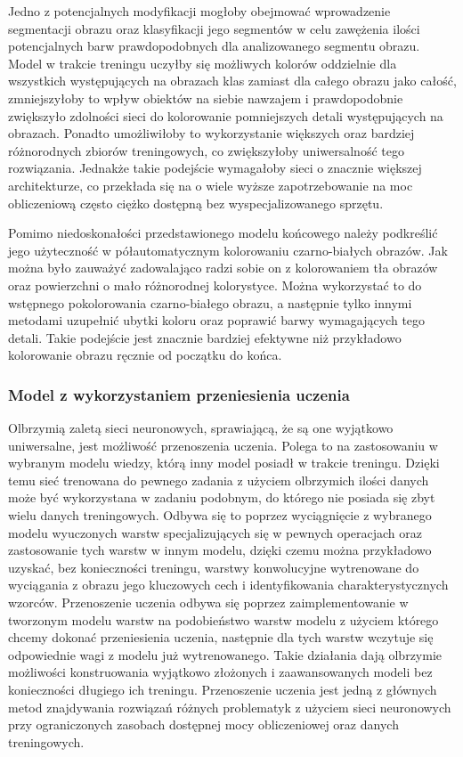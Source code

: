   Jedno z potencjalnych modyfikacji mogłoby obejmować
  wprowadzenie segmentacji obrazu oraz klasyfikacji jego segmentów w celu
  zawężenia ilości potencjalnych barw prawdopodobnych dla analizowanego segmentu obrazu.
  Model w trakcie treningu uczyłby się możliwych kolorów oddzielnie dla wszystkich
  występujących na obrazach klas zamiast dla całego obrazu jako całość,
  zmniejszyłoby to wpływ obiektów na siebie nawzajem i prawdopodobnie zwiększyło
  zdolności sieci do kolorowanie pomniejszych detali występujących na obrazach.
  Ponadto umożliwiłoby to wykorzystanie większych oraz bardziej różnorodnych
  zbiorów treningowych, co zwiększyłoby uniwersalność tego rozwiązania.
  Jednakże takie podejście wymagałoby sieci o znacznie większej architekturze,
  co przekłada się na o wiele wyższe zapotrzebowanie na moc obliczeniową często
  ciężko dostępną bez wyspecjalizowanego sprzętu.

  Pomimo niedoskonałości przedstawionego modelu końcowego należy podkreślić jego
  użyteczność w półautomatycznym kolorowaniu czarno-białych obrazów. Jak można
  było zauważyć zadowalająco radzi sobie on z kolorowaniem tła obrazów oraz
  powierzchni o mało różnorodnej kolorystyce. Można wykorzystać to do wstępnego
  pokolorowania czarno-białego obrazu, a następnie tylko innymi metodami uzupełnić
  ubytki koloru oraz poprawić barwy wymagających tego detali. Takie podejście
  jest znacznie bardziej efektywne niż przykładowo kolorowanie obrazu ręcznie od
  początku do końca.


  \subsubsection{Model z wykorzystaniem przeniesienia uczenia}

  Olbrzymią zaletą sieci neuronowych, sprawiającą, że są one wyjątkowo
  uniwersalne, jest możliwość przenoszenia uczenia. Polega
  to na zastosowaniu w wybranym modelu wiedzy, którą inny model posiadł w trakcie
  treningu. Dzięki temu sieć trenowana do pewnego zadania z użyciem olbrzymich
  ilości danych może być wykorzystana w zadaniu podobnym, do którego nie
  posiada się zbyt wielu danych treningowych. Odbywa się to poprzez
  wyciągnięcie z wybranego modelu wyuczonych warstw specjalizujących się w
  pewnych operacjach oraz zastosowanie tych warstw w innym modelu, dzięki
  czemu można przykładowo uzyskać, bez konieczności treningu, warstwy konwolucyjne wytrenowane
  do wyciągania z obrazu jego kluczowych cech i identyfikowania charakterystycznych wzorców.
  Przenoszenie uczenia odbywa się poprzez zaimplementowanie w tworzonym modelu
  warstw na podobieństwo warstw modelu z użyciem którego chcemy dokonać
  przeniesienia uczenia, następnie dla tych warstw wczytuje się odpowiednie wagi
  z modelu już wytrenowanego.
  Takie działania dają olbrzymie możliwości konstruowania wyjątkowo złożonych i
  zaawansowanych modeli bez konieczności długiego ich treningu. Przenoszenie
  uczenia jest jedną z głównych metod znajdywania rozwiązań różnych problematyk
  z użyciem sieci neuronowych przy ograniczonych zasobach dostępnej mocy
  obliczeniowej oraz danych treningowych.

